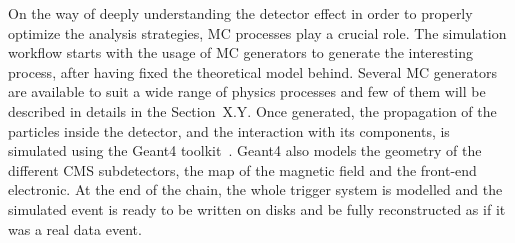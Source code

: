 On the way of deeply understanding the detector effect in order to properly optimize the analysis strategies,
MC processes play a crucial role. The simulation workflow starts with the usage of MC generators to 
generate the interesting process, after having fixed the theoretical model behind. Several MC generators are available
to suit a wide range of physics processes and few of them will be described in details in the Section~X.Y. 
Once generated, the propagation of the particles inside the detector, and the interaction with its components, 
is simulated using the Geant4 toolkit~\cite{Agostinelli:2002hh}. Geant4 also models the geometry of the different CMS subdetectors, 
the map of the magnetic field and the front-end electronic. At the end of the chain, the whole trigger system is modelled and the simulated event
is ready to be written on disks and be fully reconstructed as if it was a real data event.





























